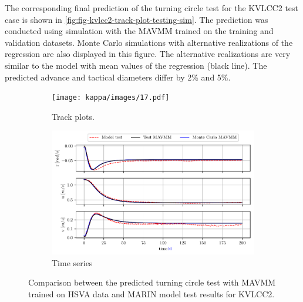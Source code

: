 The corresponding final prediction of the turning circle test for the KVLCC2 test case is shown in \autoref{fig:fig-kvlcc2-track-plot-testing-sim}. The prediction was conducted using simulation with the MAVMM trained on the training and validation datasets. Monte Carlo simulations with alternative realizations of the regression are also displayed in this figure. The alternative realizations are very similar to the model with mean values of the regression (black line).
The predicted advance and tactical diameters differ by 2\% and 5\%.
\begin{figure}[h]
    \centering

    \begin{subfigure}[b]{0.80\textwidth}
        \texttt{[image: kappa/images/17.pdf]}
        \caption{Track plots.}
    \end{subfigure}
    \vfill
    \begin{subfigure}[b]{0.80\textwidth}
        \includegraphics[width=\textwidth]{kappa/images/18.pdf}
        \caption{Time series}
    \end{subfigure}
        
    \caption{Comparison between the predicted turning circle test with MAVMM trained on HSVA data and MARIN model test results for KVLCC2.}
    \label{fig:fig-kvlcc2-track-plot-testing-sim}
\end{figure}
\clearpage